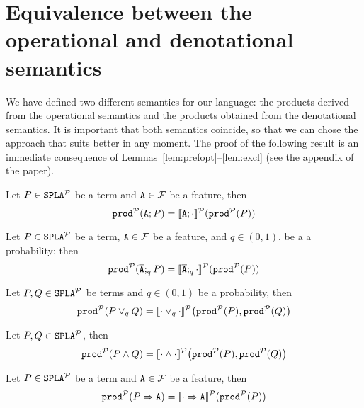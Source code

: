\section{Equivalence between the operational and denotational semantics}\label{sec:equivalence}
We have defined two different semantics for our language:
the products derived from the operational semantics and the products
obtained from the denotational semantics. It is important that
both semantics coincide, so that we can chose the approach that suits
better in any moment. The proof of the following result is an immediate consequence of Lemmas~\ref{lem:prefopt}--\ref{lem:excl} (see the appendix of the paper).

\bprop\label{prop:DenoOpe}
  Let $P\in\fodaPAp$ be a term and $\feature{A}\in\calF$ be a feature, then
  $$\prodp(\feature{A};P)=\semdenp{\feature{A};\cdot}(\prodp(P))$$
%

Let  $P\in\fodaPAp$ be a term, $\feature{A}\in\calF$ be a
  feature, and $q\in (0,1)$, be a a probability; then
  $$\prodp(\ofeature{A};_qP)=\semdenp{\ofeature{A};_q\cdot}(\prodp(P))$$
%
%

Let $P,Q\in\fodaPAp$ be terms and $q\in (0,1)$ be a probability, then
  $$\prodp(P\choice_q Q)=\semdenp{\cdot\choice_q\cdot}\bigl(\prodp(P),\prodp(Q)\bigr)$$
%
%

Let $P,Q\in\fodaPAp$, then
  $$\prodp(P\paral Q)=\semdenp{\cdot\paral\cdot}\bigl(\prodp(P),\prodp(Q)\bigr)$$
%

Let $P\in\fodaPAp$  be a term and $\feature{A}\in\calF$ be a feature, then
  $$\prodp(\mandatory{A}{P})=\semdenp{\mandatory{A}{\cdot}}(\prodp(P))$$
%

